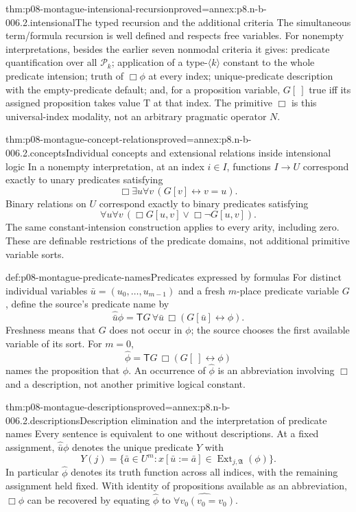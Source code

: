 \begin{hblemma}{thm:p08-montague-intensional-recursion}{proved=annex:p8.n-b-006.2.intensional}{The typed recursion and the additional criteria}
The simultaneous term/formula recursion is well defined and respects
free variables. For nonempty interpretations, besides the earlier seven
nonmodal criteria it gives:
predicate quantification over all \(\mathcal P_k\); application of a
type-\(\langle k\rangle\) constant to the whole predicate intension;
truth of \(\Box\phi\) at every index; unique-predicate description
with the empty-predicate default; and, for a proposition variable,
\(G[\ ]\) true iff its assigned proposition takes value \(\mathrm T\)
at that index. The primitive \(\Box\) is this universal-index modality,
not an arbitrary pragmatic operator \(N\).
\end{hblemma}

\begin{hbtheorem}{thm:p08-montague-concept-relations}{proved=annex:p8.n-b-006.2.concepts}{Individual concepts and extensional relations inside intensional logic}
In a nonempty interpretation, at an index \(i\in I\), functions
\(I\to U\) correspond exactly to unary predicates satisfying
\[
 \Box\exists u\forall v\,(G[v]\leftrightarrow v=u).
\]
Binary relations on \(U\) correspond exactly to binary predicates
satisfying
\[
 \forall u\forall v\,(\Box G[u,v]\lor\Box\neg G[u,v]).
\]
The same constant-intension construction applies to every arity, including
zero. These are definable restrictions of the predicate domains, not
additional primitive variable sorts.
\end{hbtheorem}

\begin{hbdefinition}{def:p08-montague-predicate-names}{Predicates expressed by formulas}
For distinct individual variables \(\bar u=(u_0,\ldots,u_{m-1})\)
and a fresh \(m\)-place predicate variable \(G\), define the source's
predicate name by
\[
 \widehat{\bar u}\phi
   =\mathsf T G\,\forall\bar u\,\Box(G[\bar u]\leftrightarrow\phi).
\]
Freshness means that \(G\) does not occur in \(\phi\); the source
chooses the first available variable of its sort. For \(m=0\),
\[
 \widehat\phi=\mathsf T G\,\Box(G[\ ]\leftrightarrow\phi)
\]
names the proposition that \(\phi\). An occurrence of \(\widehat\phi\)
is an abbreviation involving \(\Box\) and a description, not another
primitive logical constant.
\end{hbdefinition}

\begin{hbtheorem}{thm:p08-montague-descriptions}{proved=annex:p8.n-b-006.2.descriptions}{Description elimination and the interpretation of predicate names}
Every sentence is equivalent to one without descriptions. At a fixed
assignment, \(\widehat{\bar u}\phi\) denotes the unique predicate
\(Y\) with
\[
 Y(j)=\{\bar a\in U^m:x[\bar u:=\bar a]\in
                          \operatorname{Ext}_{j,\mathfrak A}(\phi)\}.
\]
In particular \(\widehat\phi\) denotes its truth function across all
indices, with the remaining assignment held fixed. With identity of
propositions available as an abbreviation, \(\Box\phi\) can be
recovered by equating \(\widehat\phi\) to
\(\widehat{\forall v_0(v_0=v_0)}\).
\end{hbtheorem}

